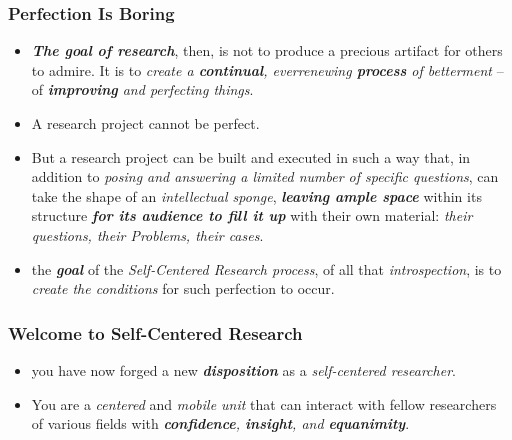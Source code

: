 \documentclass[11pt]{article}
\begin{document}
\subsubsection{Perfection Is Boring}
\begin{itemize}
\item \emph{\textbf{The goal of research}}, then, is not to produce a precious artifact for others to admire. It is to \emph{create a \textbf{continual}, everrenewing \textbf{process} of betterment} -- of \emph{\textbf{improving} and perfecting things}.

\item A research project cannot be perfect. 

\item But a research project can be built and executed in such a way that, in addition to \emph{posing and answering a limited number of specific questions}, can take the shape of an \emph{intellectual sponge}, \emph{\textbf{leaving ample space}} within its structure \emph{\textbf{for its audience to fill it up}} with their own material: \emph{their questions, their Problems, their cases}. 

\item the \emph{\textbf{goal}} of the \emph{Self-Centered Research process}, of all that \emph{introspection}, is to \emph{create the conditions} for such perfection to occur. 
\end{itemize}
\subsubsection{Welcome to Self-Centered Research}
\begin{itemize}
\item you have now forged a new \emph{\textbf{disposition}} as a \emph{self-centered researcher}. 

\item You are a \emph{centered} and \emph{mobile unit} that can interact with fellow researchers of various fields with \emph{\textbf{confidence}, \textbf{insight}, and \textbf{equanimity}}.
\end{itemize}
\end{document}
